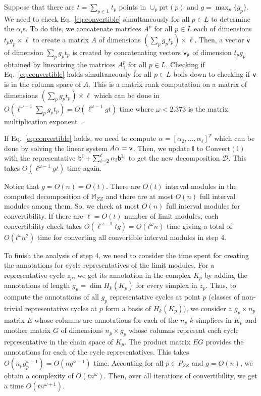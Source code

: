 \documentclass[11pt]{article}
\theoremstyle{plain}%
\newcommand{\Int}{\mathbb{I}}
\newcommand{\prt}{\mathrm{prt}}
\newcommand{\M}{\mathbb{M}}
\newcommand{\D}{\mathcal{D}}
\newcommand{\bs}{{\sf b}}
\begin{document}
 Suppose that
there are $t=\sum_{p\in L} t_p$ points in $\cup_p \prt(p)$ and $g=\max_p\{g_p\}$.
We need to check Eq.~\eqref{eq:convertible} simultaneously for all $p\in L$ to determine the 
$\alpha_i$s. To do this, we concatenate matrices $A^p$ for all $p\in L$ each of
dimensions $t_pg_p\times \ell$ to create a matrix $A$ of dimensions $(\sum_pg_pt_p)\times \ell$. 
Then, a vector $\sf v$ of dimension $\sum_p g_pt_p$ is created by concatenating vectors $\sf v_p$ of dimension
$t_pg_p$ obtained by linearizing the matrices $A_1^p$ for all $p\in L$.
Checking if Eq.~\eqref{eq:convertible} holds simultaneously for all $p\in L$ boils down to
checking if $\sf v$ is in the column space of $A$. This is a matrix rank
computation on a matrix of dimensions $(\sum_pg_pt_p)\times \ell$ which can be done in $O(\ell^{\omega-1}\sum_pg_pt_p)=O(\ell^{\omega-1}gt)$ time where $\omega< 2.373$ is the
matrix multiplication exponent~\cite{JPS13}.

If Eq.~\eqref{eq:convertible} holds, we need to compute $\alpha=[\alpha_2,\ldots,\alpha_\ell]^T$ which can be done by
solving the linear system $A\alpha={\sf v}$. Then, we update $\Int$ to $\mathrm{Convert}(\Int)$ with the representative $\bs^\Int + \sum_{i=2}^\ell \alpha_i\bs^{\Int_i}$ to get the new decomposition $\D$. This takes $O(\ell^{\omega-1} gt)$ time again.

Notice that $g = O(n) = O(t)$.
There are $O(t)$ interval modules in the computed decomposition of 
$\M_{ZZ}$ and there are at most $O(n)$
full interval modules among them. So, we check at most $O(n)$
full interval modules for convertibility. If there are $\ell = O(t)$
number of limit modules, each convertibility check takes
$O(\ell^{\omega-1}tg) = O(t^\omega n)$ time giving a total of $O(t^\omega n^2)$ time for converting all convertible interval modules in step 4.

To finish the analysis of step 4, we need to consider the time spent for creating the
annotations for cycle representatives of the limit modules. For a representative cycle $z_p$, we get its annotation in the complex $K_p$ by adding the annotations of length
$g_p=\dim H_k(K_p)$ for every simplex in $z_p$. Thus, to compute the annotations
of all $g_p$ representative cycles at point $p$ (classes of non-trivial representative cycles at $p$ form a basis of $H_k(K_p)$), we consider a $g_p\times n_p$ matrix $E$ whose columns are annotations for each of the $n_p$ $k$-simplices in $K_p$
and another matrix $G$ of dimensions $n_p\times g_p$ whose columns represent
each cycle representative in the chain space of $K_p$. The product matrix $EG$
provides the annotations for each of the cycle representatives. This takes
$O(n_pg_p^{\omega-1})=O(ng^{\omega-1})$ time. Accouting for all $p\in P_{ZZ}$ and $g=O(n)$, we obtain a complexity of $O(tn^{\omega})$. Then, over all iterations
of convertibility, we get a time $O(tn^{\omega+1})$.
\end{document}
